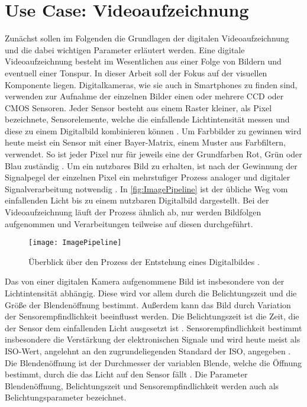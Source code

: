 \section{Use Case: Videoaufzeichnung}
\label{sec:Videoaufzeichnung}

Zunächst sollen im Folgenden die Grundlagen der digitalen Videoaufzeichnung und die dabei wichtigen Parameter erläutert werden.
Eine digitale Videoaufzeichnung besteht im Wesentlichen aus einer Folge von Bildern und eventuell einer Tonspur.
In dieser Arbeit soll der Fokus auf der visuellen Komponente liegen.
Digitalkameras, wie sie auch in Smartphones zu finden sind, verwenden zur Aufnahme der einzelnen Bilder einen oder mehrere \ac{CCD} oder \ac{CMOS} Sensoren.
Jeder Sensor besteht aus einem Raster kleiner, als Pixel bezeichnete, Sensorelemente, welche die einfallende Lichtintensität messen und diese zu einem Digitalbild kombinieren können \cite[S. 63ff.]{Szeliski_ComputerVision}.
Um Farbbilder zu gewinnen wird heute meist ein Sensor mit einer Bayer-Matrix, einem Muster aus Farbfiltern, verwendet.
So ist jeder Pixel nur für jeweils eine der Grundfarben Rot, Grün oder Blau zuständig \cite[S. 420ff.]{Schmidt_Videotechnik}.
Um ein nutzbares Bild zu erhalten, ist nach der Gewinnung der Signalpegel der einzelnen Pixel ein mehrstufiger Prozess analoger und digitaler Signalverarbeitung notwendig \cite[S. 63ff.]{Szeliski_ComputerVision}.
In \autoref{fig:ImagePipeline} ist der übliche Weg vom einfallenden Licht bis zu einem nutzbaren Digitalbild dargestellt. 
Bei der Videoaufzeichnung läuft der Prozess ähnlich ab, nur werden Bildfolgen aufgenommen und Verarbeitungen teilweise auf diesen durchgeführt.
\begin{figure}
    \centering
    \texttt{[image: ImagePipeline]}
    \caption{Überblick über den Prozess der Entstehung eines Digitalbildes \cite[S. 64ff.]{Szeliski_ComputerVision}.}
    \label{fig:ImagePipeline}
\end{figure}


Das von einer digitalen Kamera aufgenommene Bild ist insbesondere von der Lichtintensität abhängig.
Diese wird vor allem durch die Belichtungszeit und die Größe der Blendenöffnung bestimmt.
Außerdem kann das Bild durch Variation der Sensorempfindlichkeit beeinflusst werden.
Die Belichtungszeit ist die Zeit, die der Sensor dem einfallenden Licht ausgesetzt ist \cite[S. 390ff.]{Schmidt_Videotechnik}.
Sensorempfindlichkeit bestimmt insbesondere die Verstärkung der elektronischen Signale und wird heute meist als \acs{ISO}-Wert, angelehnt an den zugrundeliegenden Standard der \acf{ISO}, angegeben \cite[S. 412ff.]{Schmidt_Videotechnik}.
Die Blendenöffnung ist der Durchmesser der variablen Blende, welche die Öffnung bestimmt, durch die das Licht auf den Sensor fällt \cite[S. 444ff.]{Schmidt_Videotechnik}.
Die Parameter Blendenöffnung, Belichtungszeit und Sensorempfindlichkeit werden auch als Belichtungsparameter bezeichnet.


